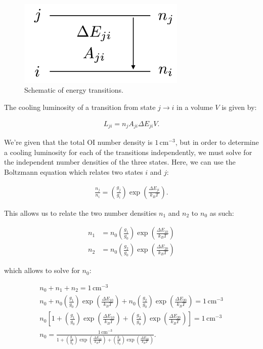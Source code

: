 \documentclass[12pt]{article}
\begin{document}
\begin{figure}[h] \label{fig:ji}
\includegraphics[width=8cm]{ji.png}
\centering
\caption{Schematic of energy transitions.}
\end{figure}

The cooling luminosity of a transition from state $j \rightarrow i$ in a volume $V$ is given by:

\begin{align*}
L_{ji} = n_j A_{ji}\Delta E_{ji}V.
\end{align*}

We're given that the total $\mathrm{OI}$ number density is $1\,\mathrm{cm^{-3}}$, but in order to determine a cooling luminosity for each of the transitions independently, we must solve for the independent number densities of the three states. Here, we can use the Boltzmann equation which relates two states $i$ and $j$:

\begin{align*}
\frac{n_j}{n_i} = \left(\frac{g_j}{g_i}\right)\exp\left(\frac{\Delta E_{ji}}{k_BT}\right).
\end{align*}

This allows us to relate the two number densities $n_1$ and $n_2$ to $n_0$ as such:

\begin{equation*}
\begin{split}
n_1 &= n_0\left(\frac{g_1}{g_0}\right)\exp\left(\frac{\Delta E_{10}}{k_BT}\right)\\
n_2 &= n_0\left(\frac{g_2}{g_0}\right)\exp\left(\frac{\Delta E_{20}}{k_BT}\right)
\end{split}
\end{equation*}

which allows to solve for $n_0$:

\begin{align*}
n_0 + n_1 + n_2 = 1 \, \mathrm{cm^{-3}}\\
n_0 + n_0\left(\frac{g_1}{g_0}\right)\exp\left(\frac{\Delta E_{10}}{k_BT}\right) + n_0\left(\frac{g_2}{g_0}\right)\exp\left(\frac{\Delta E_{20}}{k_BT}\right) = 1 \, \mathrm{cm^{-3}}\\
n_0 \left[1 + \left(\frac{g_1}{g_0}\right)\exp\left(\frac{\Delta E_{10}}{k_BT}\right) + \left(\frac{g_2}{g_0}\right)\exp\left(\frac{\Delta E_{20}}{k_BT}\right)\right] = 1 \, \mathrm{cm^{-3}}\\
n_0 = \frac{1\,\mathrm{cm^{-3}}}{1 + \left(\frac{g_1}{g_0}\right)\exp\left(\frac{\Delta E_{10}}{k_BT}\right) + \left(\frac{g_2}{g_0}\right)\exp\left(\frac{\Delta E_{20}}{k_BT}\right)}.
\end{align*}
\end{document}
